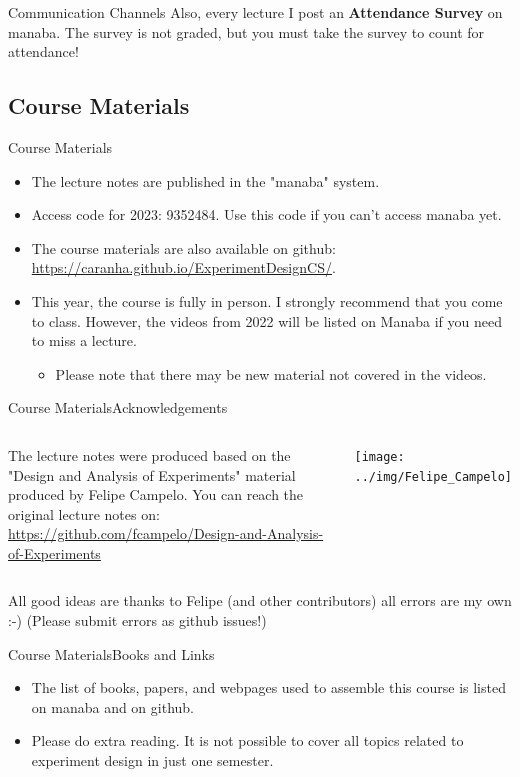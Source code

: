 \documentclass[aspectratio=169]{beamer}
\begin{document}
\begin{CJK}{UTF8}{ipxm}
\begin{frame}[t]{Communication Channels}{}
  Also, every lecture I post an {\bf Attendance Survey} on manaba. The
  survey is not graded, but \alert{you must take the survey to count
    for attendance!}
\end{frame}

\subsection{Course Materials}
\begin{frame}[t]{Course Materials}
  \begin{itemize}
  \item The lecture notes are published in the "manaba" system.
  \item Access code for 2023: \alert{9352484}. Use this code if you can't access manaba yet.
    \bigskip

  \item The course materials are also available on github:\\
    \url{https://caranha.github.io/ExperimentDesignCS/}.\medskip

  \item This year, the course is fully in person. I strongly recommend
    that you come to class. However, the videos from 2022 will be
    listed on Manaba if you need to miss a lecture.
    \begin{itemize}
    \item Please note that there may be new material not covered in the videos.
    \end{itemize}
  \end{itemize}
\end{frame}

\begin{frame}{Course Materials}{Acknowledgements}
  \begin{columns}
    The lecture notes were produced based on the "Design and Analysis of Experiments" material produced by Felipe Campelo. You can reach the original lecture notes on: \url{https://github.com/fcampelo/Design-and-Analysis-of-Experiments}

    \hfill\texttt{[image: ../img/Felipe\_Campelo]}
  \end{columns}
  \bigskip

  All good ideas are thanks to Felipe (and other contributors) all errors are my own :-) (Please submit errors as github issues!)
\end{frame}

\begin{frame}[t]{Course Materials}{Books and Links}
  \begin{itemize}
  \item The list of books, papers, and webpages used to assemble this course
    is listed on manaba and on github.
  \item Please do extra reading. It is not possible to cover all
    topics related to experiment design in just one semester.
  \end{itemize}
\end{frame}




\end{CJK}
\end{document}
